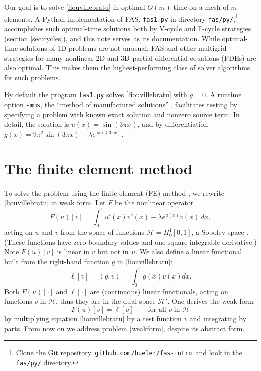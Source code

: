 \documentclass[letterpaper,final,12pt,reqno]{amsart}
\newcommand{\ip}[2]{\left<#1,#2\right>}
\begin{document}
Our goal is to solve \eqref{liouvillebratu} in optimal $O(m)$ time on a mesh of $m$ elements.  A Python implementation of FAS, \texttt{fas1.py} in directory \texttt{fas/py/},\footnote{Clone the Git repository\, \href{https://github.com/bueler/fas-intro}{\texttt{github.com/bueler/fas-intro}}\, and look in the \texttt{fas/py/} directory.} accomplishes such optimal-time solutions both by V-cycle and F-cycle strategies (section \ref{sec:cycles}), and this note serves as its documentation.  While optimal-time solutions of 1D problems are not unusual, FAS and other multigrid strategies for many nonlinear 2D and 3D partial differential equations (PDEs) are also optimal.  This makes them the highest-performing class of solver algorithms for such problems.

By default the program \texttt{fas1.py} solves \eqref{liouvillebratu} with $g=0$.  A runtime option \texttt{-mms}, the ``method of manufactured solutions'' \cite{Bueler2021}, facilitates testing by specifying a problem with known exact solution and nonzero source term.  In detail, the solution is $u(x)=\sin(3\pi x)$, and by differentiation $g(x)=9\pi^2 \sin(3\pi x) - \lambda e^{\sin(3\pi x)}$.


\section{The finite element method}  \label{sec:femethod}

To solve the problem using the finite element (FE) method \cite{Braess2007,Bueler2021,Elmanetal2014}, we rewrite \eqref{liouvillebratu} in weak form.  Let $F$ be the nonlinear operator
\begin{equation}
  F(u)[v] = \int_0^1 u'(x) v'(x) - \lambda e^{u(x)} v(x)\, dx,  \label{operator}
\end{equation}
acting on $u$ and $v$ from the space of functions $\mathcal{H}=H_0^1[0,1]$, a Sobolev space \cite{Evans2010}.  (These functions have zero boundary values and one square-integrable derivative.)  Note $F(u)[v]$ is linear in $v$ but not in $u$.  We also define a linear functional built from the right-hand function $g$ in \eqref{liouvillebratu}:
\begin{equation}
  \ell[v] = \ip{g}{v} = \int_0^1 g(x) v(x) dx.  \label{rhsfunctional}
\end{equation}
Both $F(u)[\cdot]$ and $\ell[\cdot]$ are (continuous) linear functionals, acting on functions $v$ in $\mathcal{H}$, thus they are in the dual space $\mathcal{H}'$.  One derives the weak form
\begin{equation}
  F(u)[v] = \ell[v] \qquad \text{for all $v$ in $\mathcal{H}$} \label{weakform}
\end{equation}
by multiplying equation \eqref{liouvillebratu} by a test function $v$ and integrating by parts.  From now on we address problem \eqref{weakform}, despite its abstract form.
\end{document}
